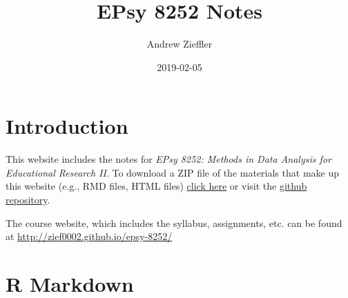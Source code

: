 \documentclass[]{book}
\title{EPsy 8252 Notes}
\author{Andrew Zieffler}
\date{2019-02-05}
\newenvironment{Shaded}{\begin{snugshade}}{\end{snugshade}}
\newcommand{\CommentTok}[1]{\textcolor[rgb]{0.56,0.35,0.01}{\textit{#1}}}
\newcommand{\DataTypeTok}[1]{\textcolor[rgb]{0.13,0.29,0.53}{#1}}
\newcommand{\DecValTok}[1]{\textcolor[rgb]{0.00,0.00,0.81}{#1}}
\newcommand{\KeywordTok}[1]{\textcolor[rgb]{0.13,0.29,0.53}{\textbf{#1}}}
\newcommand{\NormalTok}[1]{#1}
\newcommand{\OperatorTok}[1]{\textcolor[rgb]{0.81,0.36,0.00}{\textbf{#1}}}
\newcommand{\OtherTok}[1]{\textcolor[rgb]{0.56,0.35,0.01}{#1}}
\newcommand{\StringTok}[1]{\textcolor[rgb]{0.31,0.60,0.02}{#1}}
\begin{document}
\maketitle

{
\setcounter{tocdepth}{1}
\tableofcontents
}
\begin{Shaded}
\end{Shaded}

\hypertarget{introduction}{%
\chapter*{Introduction}\label{introduction}}

This website includes the notes for \emph{EPsy 8252: Methods in Data Analysis for Educational Research II}. To download a ZIP file of the materials that make up this website (e.g., RMD files, HTML files) \href{https://github.com/zief0002/book-8252/archive/master.zip}{click here} or visit the \href{https://github.com/zief0002/book-8252}{github repository}.

The course website, which includes the syllabus, assignments, etc. can be found at \url{http://zief0002.github.io/epsy-8252/}

\hypertarget{rmarkdown}{%
\chapter{R Markdown}\label{rmarkdown}}
\end{document}
